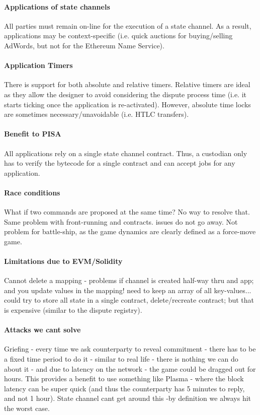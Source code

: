 \documentclass{llncs}
\begin{document}
\paragraph{Applications of state channels} All parties must remain on-line for the execution of a state channel. As a result, applications may be context-specific (i.e. quick auctions for buying/selling AdWords, but not for the Ethereum Name Service). 

\paragraph{Application Timers} There is support for both absolute and relative timers. Relative timers are ideal as they allow the designer to avoid considering the dispute process time (i.e. it starts ticking once the application is re-activated). However, absolute time locks are sometimes necessary/unavoidable (i.e. HTLC transfers). 

\paragraph{Benefit to PISA} All applications rely on a single state channel contract. Thus, a custodian only has to verify the bytecode for a single contract and can accept jobs for any application. 

\paragraph{Race conditions} What if two commands are proposed at the same time? No way to resolve that. Same problem with front-running and contracts. issues do not go away. Not problem for battle-ship, as the game dynamics are clearly defined as a force-move game. 

\paragraph{Limitations due to EVM/Solidity} Cannot delete a mapping - problems if channel is created half-way thru and app; and you update values in the mapping! need to keep an array of all key-values... could try to store all state in a single contract, delete/recreate contract; but that is expensive (similar to the dispute registry).  


\paragraph{Attacks we cant solve} Griefing - every time we ask counterparty to reveal commitment - there has to be a fixed time period to do it - similar to real life - there is nothing we can do about it - and due to latency on the network - the game could be dragged out for hours. This provides a benefit to use something like Plasma - where the block latency can be super quick (and thus the counterparty has 5 minutes to reply, and not 1 hour). State channel cant get around this -by definition we always hit the worst case. 
\end{document}
